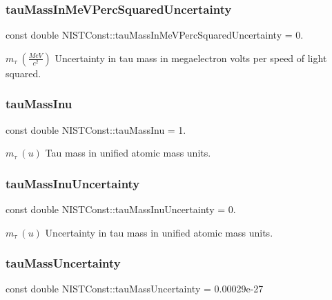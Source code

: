 \subsubsection{\texorpdfstring{tau\+Mass\+In\+Me\+V\+Perc\+Squared\+Uncertainty}{tauMassInMeVPercSquaredUncertainty}}
{\footnotesize\ttfamily const double N\+I\+S\+T\+Const\+::tau\+Mass\+In\+Me\+V\+Perc\+Squared\+Uncertainty = 0.}

$m_\tau \ (\frac{MeV}{c^2})$ Uncertainty in tau mass in megaelectron volts per speed of light squared. \mbox{\label{group___tau_gaa0a5019135251853d2761cb9af892aea}} 
\subsubsection{\texorpdfstring{tau\+Mass\+Inu}{tauMassInu}}
{\footnotesize\ttfamily const double N\+I\+S\+T\+Const\+::tau\+Mass\+Inu = 1.}

$m_\tau \ (u)$ Tau mass in unified atomic mass units. \mbox{\label{group___tau_gad6e1aecdf7331e89b665c40d7d6dad86}} 
\subsubsection{\texorpdfstring{tau\+Mass\+Inu\+Uncertainty}{tauMassInuUncertainty}}
{\footnotesize\ttfamily const double N\+I\+S\+T\+Const\+::tau\+Mass\+Inu\+Uncertainty = 0.}

$m_\tau \ (u)$ Uncertainty in tau mass in unified atomic mass units. \mbox{\label{group___tau_gad7d60828078581e6fc33f24fa369b9f2}} 
\subsubsection{\texorpdfstring{tau\+Mass\+Uncertainty}{tauMassUncertainty}}
{\footnotesize\ttfamily const double N\+I\+S\+T\+Const\+::tau\+Mass\+Uncertainty = 0.\+00029e-\/27}

